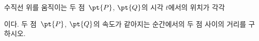 수직선 위를 움직이는 두 점~$\pt{P}$, $\pt{Q}$의 시각 $t$에서의 위치가 각각\par\smallskip{}\par\smallskip\noindent 이다. 두 점~$\pt{P}$, $\pt{Q}$의 속도가 같아지는 순간에서의 두 점 사이의 거리를 구하시오.

